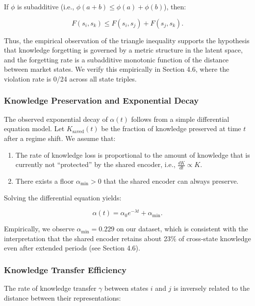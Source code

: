 \documentclass[review]{elsarticle}
\begin{document}
If $\phi$ is subadditive (i.e., $\phi(a+b) \le \phi(a) + \phi(b)$), then:

\begin{equation}
F(s_i, s_k) \le F(s_i, s_j) + F(s_j, s_k).
\end{equation}

Thus, the empirical observation of the triangle inequality supports the hypothesis that knowledge forgetting is governed by a metric structure in the latent space, and the forgetting rate is a subadditive monotonic function of the distance between market states. We verify this empirically in Section 4.6, where the violation rate is 0/24 across all state triples.

\subsubsection{Knowledge Preservation and Exponential Decay}

The observed exponential decay of $\alpha(t)$ follows from a simple differential equation model. Let $K_{\text{saved}}(t)$ be the fraction of knowledge preserved at time $t$ after a regime shift. We assume that:

\begin{enumerate}
\item The rate of knowledge loss is proportional to the amount of knowledge that is currently not ``protected'' by the shared encoder, i.e., $\frac{dK}{dt} \propto K$.
\item There exists a floor $\alpha_{\min} > 0$ that the shared encoder can always preserve.
\end{enumerate}

Solving the differential equation yields:

\begin{equation}
\alpha(t) = \alpha_0 e^{-\lambda t} + \alpha_{\min}.
\end{equation}

Empirically, we observe $\alpha_{\min} = 0.229$ on our dataset, which is consistent with the interpretation that the shared encoder retains about 23\% of cross-state knowledge even after extended periods (see Section 4.6).

\subsubsection{Knowledge Transfer Efficiency}

The rate of knowledge transfer $\gamma$ between states $i$ and $j$ is inversely related to the distance between their representations:
\end{document}
